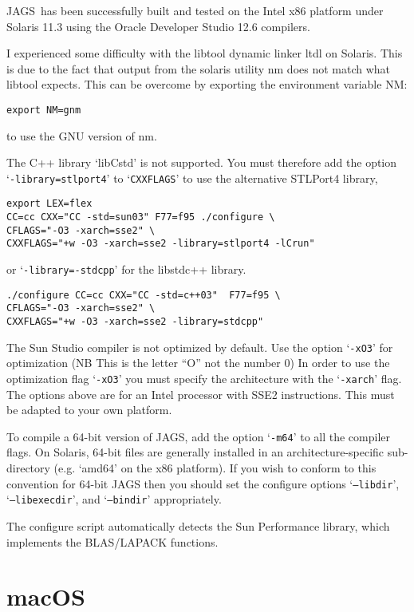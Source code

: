 \documentclass[11pt, a4paper, titlepage]{article}
\newcommand{\JAGS}{\textsf{JAGS}}
\newcommand{\samp}[1]{{`\bgroup\normalfont\texttt{#1}'\egroup}}
\newcommand{\file}[1]{{`\normalfont\textsf{#1}'}}
\let\option=\samp
\begin{document}
\JAGS\ has been successfully built and tested on the Intel x86
platform under Solaris 11.3 using the Oracle Developer Studio 12.6
compilers.

I experienced some difficulty with the libtool dynamic linker ltdl on
Solaris. This is due to the fact that output from the solaris utility
nm does not match what libtool expects. This can be overcome by
exporting the environment variable NM:
\begin{verbatim}
export NM=gnm
\end{verbatim}
to use the GNU version of nm.

The C++ library \file{libCstd} is not supported. You must therefore
add the option \option{-library=stlport4} to \option{CXXFLAGS} to use
the alternative STLPort4 library,
\begin{verbatim}
export LEX=flex
CC=cc CXX="CC -std=sun03" F77=f95 ./configure \
CFLAGS="-O3 -xarch=sse2" \
CXXFLAGS="+w -O3 -xarch=sse2 -library=stlport4 -lCrun"
\end{verbatim}
or \option{-library=-stdcpp} for the libstdc++ library.
\begin{verbatim}
./configure CC=cc CXX="CC -std=c++03"  F77=f95 \
CFLAGS="-O3 -xarch=sse2" \
CXXFLAGS="+w -O3 -xarch=sse2 -library=stdcpp"
\end{verbatim}

The Sun Studio compiler is not optimized by default. Use the option
\option{-xO3} for optimization (NB This is the letter ``O'' not the
number 0) In order to use the optimization flag \option{-xO3} you
must specify the architecture with the \option{-xarch} flag. The options
above are for an Intel processor with SSE2 instructions. This must be
adapted to your own platform.


To compile a 64-bit version of JAGS, add the option \option{-m64} to
all the compiler flags. On Solaris, 64-bit files are generally
installed in an architecture-specific sub-directory (e.g.
\file{amd64} on the x86 platform). If you wish to conform to this
convention for 64-bit JAGS then you should set the configure options
\option{--libdir}, \option{--libexecdir}, and \option{--bindir}
appropriately.

The configure script automatically detects the Sun Performance library,
which implements the BLAS/LAPACK functions.  

\clearpage
\section{macOS}
\end{document}
